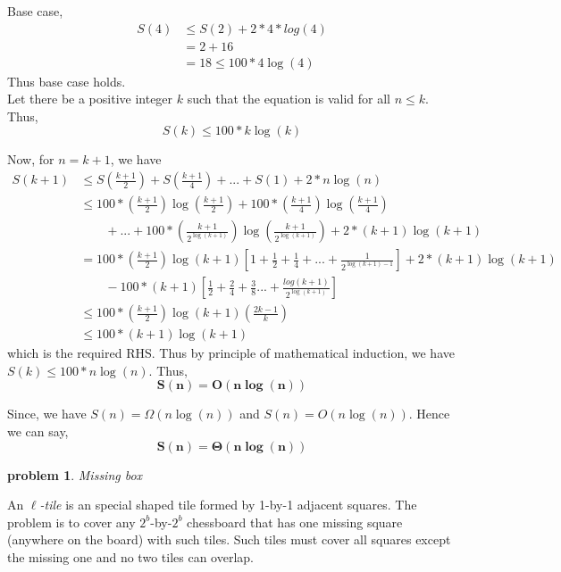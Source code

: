 \documentclass[11pt]{article}
\newtheorem{problem}{\sc\color{cit}problem}
\begin{document}
\noindent Base case, 
\begin{equation}
    \begin{split}
       S(4) &\leq S(2)+2*4*log(4)\\
       &= 2+16\\
       &=18 \leq 100*4\log(4)
    \end{split}
\end{equation}
Thus base case holds.\\
\noindent Let there be a positive integer $k$ such that the equation is valid for all $n \leq k$. Thus,
$$ S(k) \leq 100*k\log(k)$$

\noindent Now, for $n=k+1$, we have
\begin{equation}
    \begin{split}
       S(k+1) &\leq S\left(\frac{k+1}{2}\right)+S\left(\frac{k+1}{4}\right)+...+S(1)+2*n\log(n)\\
       &\leq 100*\left(\frac{k+1}{2}\right)\log\left(\frac{k+1}{2}\right)+100*\left(\frac{k+1}{4}\right)\log\left(\frac{k+1}{4}\right)\\
       &\quad \quad +...+100*\left(\frac{k+1}{2^{\log(k+1)}}\right)\log\left(\frac{k+1}{2^{\log(k+1)}}\right) + 2*(k+1)\log(k+1)\\
       &= 100*\left(\frac{k+1}{2}\right)\log(k+1)\left[1+\frac{1}{2}+\frac{1}{4}+...+\frac{1}{2^{\log(k+1)-1}}\right]+2*(k+1)\log(k+1)\\
       &\quad \quad - 100*(k+1)\left[\frac{1}{2}+\frac{2}{4}+\frac{3}{8}...+\frac{log(k+1)}{2^{\log(k+1)}}\right]\\
       &\leq 100*\left(\frac{k+1}{2}\right)\log(k+1)\left(\frac{2k-1}{k}\right)\\
       &\leq 100*(k+1)\log(k+1)
    \end{split}
\end{equation}
which is the required RHS. Thus by principle of mathematical induction, we have
$ S(k) \leq 100*n\log(n)$. Thus,
$$\mathbf{S(n) = O(n\log(n))}$$

Since, we have $S(n) = \Omega(n\log(n))$ and $S(n) = O(n\log(n))$.
Hence we can say,
$$\mathbf{S(n) = \Theta(n\log(n))}$$

\newpage

\begin{problem}{Missing box}\end{problem}
An {\em $\ell$-tile} is an special shaped tile formed by 1-by-1 adjacent
squares. The problem is to cover any $2^b$-by-$2^b$ chessboard that has
one missing square (anywhere on the board) with such tiles. Such tiles
must cover all squares except the missing one and no two tiles
can overlap.
\end{document}

